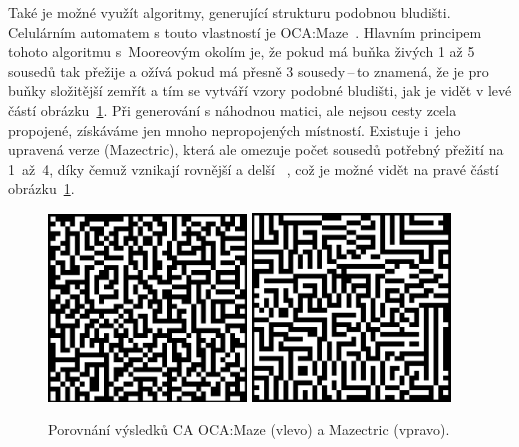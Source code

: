Také je možné využít algoritmy, generující strukturu podobnou bludišti. Celulárním automatem s touto vlastností je OCA:Maze~\cite{OCA:Maze}. Hlavním principem tohoto algoritmu s~Mooreovým okolím je, že pokud má buňka živých 1 až 5 sousedů tak přežije a ožívá pokud má přesně 3 sousedy\,--\,to znamená, že je pro buňky složitější zemřít a tím se vytváří vzory podobné bludišti, jak je vidět v levé částí obrázku~\ref{fig:OCA:Maze}. Při generování s náhodnou matici, ale nejsou cesty zcela propojené, získáváme jen mnoho nepropojených místností. Existuje i~jeho upravená verze (Mazectric), která ale omezuje počet sousedů potřebný přežití na 1~až~4, díky čemuž vznikají rovnější a delší ~\cite{OCA:Maze}, což je možné vidět na pravé částí obrázku~\ref{fig:OCA:Maze}.
\begin{figure}[H]
    \centering
    \includegraphics[width=0.47\textwidth]{obrazky-figures/ch2/OCA:Maze.png}\hspace{0.5cm}
    \includegraphics[width=0.47\textwidth]{obrazky-figures/ch2/Mazectric.png}
    \caption{Porovnání výsledků CA OCA:Maze (vlevo) a Mazectric (vpravo).}
    \label{fig:OCA:Maze}
\end{figure}
    
